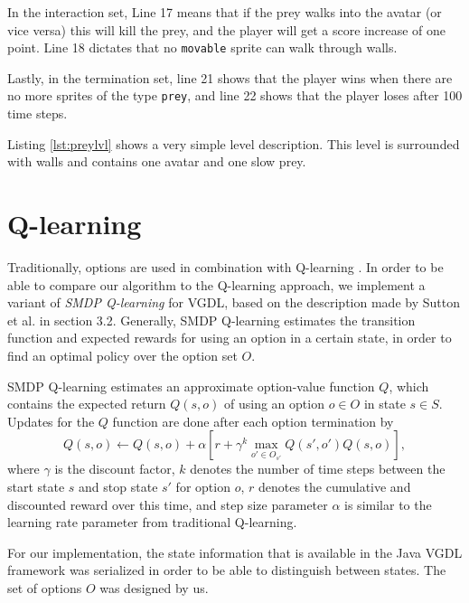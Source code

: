 In the interaction set, Line 17 means that if the prey walks into the avatar (or
vice versa) this will kill the prey, and the player will get a score increase of
one point. Line 18 dictates that no \texttt{movable} sprite can walk through
walls.

Lastly, in the termination set, line 21 shows that the player wins when there
are no more sprites of the type \texttt{prey}, and line 22 shows that the player
loses after 100 time steps.

Listing \ref{lst:preylvl} shows a very simple level description. This level is
surrounded with walls and contains one avatar and one slow prey. 

\section{Q-learning}
Traditionally, options are used in combination with Q-learning
\cite{sutton1999between}. In order to be able to compare our algorithm to the
Q-learning approach, we implement a variant of \emph{SMDP Q-learning} for
VGDL, based on the description made by Sutton et al. in section 3.2. Generally,
SMDP Q-learning estimates the transition function and expected rewards for using
an option in a certain state, in order to find an optimal policy over the option
set $O$.

SMDP Q-learning estimates an approximate option-value function $Q$, which
contains the expected return $Q(s, o)$ of using an option $o \in O$ in state $s
\in S$. Updates for the $Q$ function are done after each option termination by
\begin{equation}
	Q(s, o) \gets Q(s, o) + \alpha \left[r + \gamma^k \max_{o' \in O_{s'}}Q(s',
	o') Q(s, o)\right],
\end{equation}
where $\gamma$ is the discount factor, $k$ denotes the number of time steps
between the start state $s$ and stop state $s'$ for option $o$, $r$ denotes
the cumulative and discounted reward over this time, and step size parameter
$\alpha$ is similar to the learning rate parameter from traditional Q-learning.

For our implementation, the state information that is available in the Java VGDL
framework was serialized in order to be able to distinguish between states. The
set of options $O$ was designed by us.
